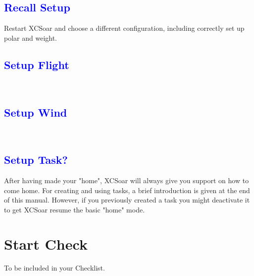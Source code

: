 \subsection*{\textcolor{blue}{Recall Setup}}
Restart XCSoar and choose a different configuration, including correctly set 
up polar and weight.

\subsection*{\textcolor{blue}{Setup Flight}}
\begin{flushleft}\hspace*{1cm}\blink{}\\\end{flushleft}

\subsection*{\textcolor{blue}{Setup Wind}}
\begin{flushleft}\hspace*{1cm}\blink{}\\\end{flushleft}

\subsection*{\textcolor{blue}{Setup Task?}}
After having made your "home", XCSoar will always give you support on how to 
come home. For creating and using tasks, a brief introduction is given at the 
end of this manual. However, if you previously created a task you might 
deactivate it to get XCSoar resume the basic "home" mode.


\newpage\section{Start Check}
To be included in your Checklist.

